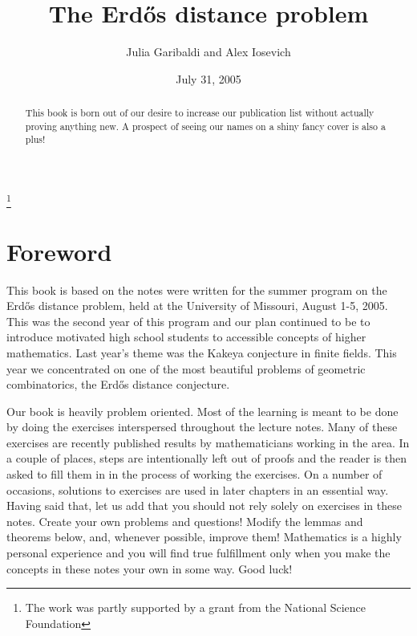\documentclass[]{stml-l}
\numberwithin{equation}{chapter}
\theoremstyle{plain}
\theoremstyle{definition}
\theoremstyle{remark}
\begin{document}
\frontmatter

\title{The Erd\H{o}s
distance problem}
\author{Julia
Garibaldi and Alex
Iosevich}

\date{July 31, 2005}

\address{Department of Mathematics, University of Missouri-Columbia,
Columbia Missouri 65211 USA}
\thanks{The work was
partly supported by a
grant from the National Science Foundation}

\begin{abstract} This book is born out of our desire to increase our publication list without actually proving anything new. A prospect of seeing our names on a shiny fancy cover is also a plus!
\end{abstract}

\maketitle

\tableofcontents

\chapter*{Foreword}

This book is based on the notes were written for the summer program on the Erd\H{o}s
distance problem, held at the University of Missouri, August
1-5, 2005. This was the second year of this program and our plan
continued to be to introduce motivated high school students to
accessible concepts of higher mathematics. Last year's theme was
the Kakeya conjecture in finite fields. This year we concentrated
on one of the most beautiful problems of geometric combinatorics,
the Erd\H{o}s distance conjecture.

Our book is heavily problem oriented. Most of the learning is
meant to be done by doing the exercises interspersed throughout
the lecture notes. Many of these exercises are recently published
results by mathematicians working in the area. In a couple of
places, steps are intentionally left out of proofs and the reader
is then asked to fill them in in the process of working the
exercises. On a number of occasions, solutions to exercises
are used in later chapters in an essential way. Having said that,
let us add that you should not rely solely on exercises in these
notes. Create your own problems and questions! Modify the
lemmas and theorems below, and, whenever possible,
improve them! Mathematics is a highly personal experience and
you will find true fulfillment only when you make the concepts
in these notes your own in some way. Good luck!
\end{document}
